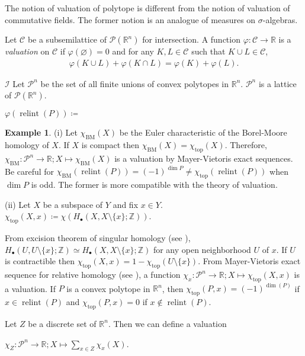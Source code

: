 \documentclass[a4paper,dvipdfmx,reqno,12pt]{amsart}
\makeatletter
\newcommand{\ind}[2]{\emph{#1}\index{1{#2}@{#1}}}
\theoremstyle{definition}
\newtheorem{Eg}[Thm]{Example}
\newcommand{\deq}{\coloneqq}
\newcommand{\emp}{\varnothing}%
\newcommand{\R}{\mathbb{R}}%
\newcommand{\Z}{\mathbb{Z}}%
\newcommand{\mcal}[1]{\mathcal{#1}}%
\newcommand{\opn}[1]{\operatorname{#1}}
\numberwithin{equation}{section}
\makeatother
\begin{document}
The notion of valuation of polytope is different from the notion
of valuation of commutative fields. The former notion is an analogue
of measures on $\sigma$-algebras.

Let $\mathscr{C}$ be a subsemilattice of $\mcal{P}(\R^{n})$ for
intersection.
A function $\varphi:\mathscr{C} \to \R$ is a
\ind{valuation}{valuation} on $\mathscr{C}$ if $\varphi(\emp)=0$ and for any
$K,L\in \mathscr{C}$ such that $K\cup L \in\mathscr{C}$,
\begin{align}
  \varphi(K\cup L)+\varphi(K\cap L)=\varphi(K)+\varphi(L).
\end{align}

$\mathscr{I}$
Let $\mathscr{P}^{n}$ be the set of all finite unions of convex
polytopes in $\R^{n}$.
$\mathscr{P}^{n}$ is a lattice of $\mcal{P}(\R^{n})$.

$\varphi(\opn{relint}(P))\deq $

\begin{Eg}
  (i) Let $\chi_{\opn{BM}}(X)$ be the Euler characteristic of
  the Borel-Moore homology of $X$. If $X$ is compact
  then $\chi_{\opn{BM}}(X)=\chi_{\opn{top}}(X)$.
  Therefore,
  $\chi_{\opn{BM}}\colon\mathscr{P}^{n}\to \R ; X\mapsto \chi_{\opn{BM}}(X)$ is a valuation
  by Mayer-Vietoris exact sequences.
  Be careful for
  $\chi_{\opn{BM}}(\opn{relint}(P))=(-1)^{\dim P}
    \ne \chi_{\opn{top}}(\opn{relint}(P))$ when $\dim P$ is odd.
  The former is more compatible with the theory of valuation.

  (ii) Let $X$ be a subspace of $Y$ and fix $x\in Y$.
  $\chi_{\opn{top}}(X,x)\deq \chi(H_{\bullet}(X,X\setminus\{x\};\Z))$.

  From excision theorem of singular homology (see
  \cite[Theorem 2.20]{hatcherAlgebraicTopology2002a}),
  $H_{\bullet}(U,U\setminus\{x\};\Z)\simeq
    H_{\bullet}(X,X\setminus\{x\};\Z)$ for any open neighborhood $U$ of
  $x$. If $U$ is contractible then
  $\chi_{\opn{top}}(X,x)=1-\chi_{\opn{top}}(U\setminus \{x\})$.
  From Mayer-Vietoris exact sequence for relative homology
  (see \cite[p.152]{hatcherAlgebraicTopology2002a}), a function
  $\chi_x:\mathscr{P}^{n}\to \R;X\mapsto \chi_{\opn{top}}(X,x)$
  is a valuation.
  If $P$ is a convex polytope in $\R^{n}$, then
  $\chi_{\opn{top}}(P,x)=(-1)^{\dim (P)}$ if $x\in \opn{relint}(P)$
  and $\chi_{\opn{top}}(P,x)=0$ if $x\notin \opn{relint}(P)$.

  Let $Z$ be a discrete set of $\R^{n}$. Then we can define a valuation

  $\chi_{Z}:\mathscr{P}^{n}\to \R; X\mapsto \sum_{x\in Z}\chi_{x}(X)$.
\end{Eg}
\end{document}
